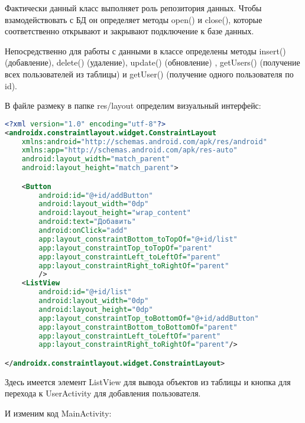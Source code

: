 Фактически данный класс выполняет роль репозитория данных. Чтобы
взамодействовать с БД он определяет методы open() и close(), которые
соответственно открывают и закрывают подключение к базе данных.\par
Непосредственно для работы с данными в классе определены методы insert()
(добавление), delete() (удаление), update() (обновление)
, getUsers() (получение всех пользователей из таблицы) и getUser()
(получение одного пользователя по id).\par
В файле размеку в папке res/layout определим визуальный
интерфейс:

\begin{lstlisting}[language=XML
	, label=lst:
	]
<?xml version="1.0" encoding="utf-8"?>
<androidx.constraintlayout.widget.ConstraintLayout
    xmlns:android="http://schemas.android.com/apk/res/android"
    xmlns:app="http://schemas.android.com/apk/res-auto"
    android:layout_width="match_parent"
    android:layout_height="match_parent">

    <Button
        android:id="@+id/addButton"
        android:layout_width="0dp"
        android:layout_height="wrap_content"
        android:text="Добавить"
        android:onClick="add"
        app:layout_constraintBottom_toTopOf="@+id/list"
        app:layout_constraintTop_toTopOf="parent"
        app:layout_constraintLeft_toLeftOf="parent"
        app:layout_constraintRight_toRightOf="parent"
        />
    <ListView
        android:id="@+id/list"
        android:layout_width="0dp"
        android:layout_height="0dp"
        app:layout_constraintTop_toBottomOf="@+id/addButton"
        app:layout_constraintBottom_toBottomOf="parent"
        app:layout_constraintLeft_toLeftOf="parent"
        app:layout_constraintRight_toRightOf="parent"/>

</androidx.constraintlayout.widget.ConstraintLayout>
\end{lstlisting}

Здесь имеется элемент ListView для вывода объектов из таблицы и кнопка
для перехода к UserActivity для добавления пользователя.\par
И изменим код MainActivity:

